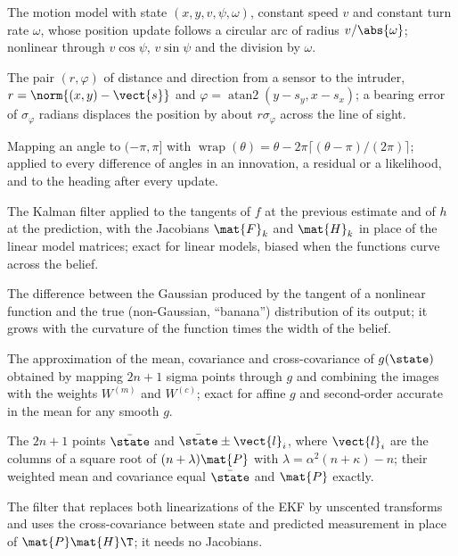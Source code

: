 \item[Coordinated-turn model] The motion model with state $(x, y, v, \psi, \omega)$, constant speed $v$ and constant turn rate $\omega$, whose position update follows a circular arc of radius $v/\abs{\omega}$; nonlinear through $v\cos\psi$, $v\sin\psi$ and the division by $\omega$.
\item[Range--bearing measurement] The pair $(r, \varphi)$ of distance and direction from a sensor to the intruder, $r = \norm{(x, y) - \vect{s}}$ and $\varphi = \operatorname{atan2}(y - s_y, x - s_x)$; a bearing error of $\sigma_\varphi$ radians displaces the position by about $r\sigma_\varphi$ across the line of sight.
\item[Angle wrapping] Mapping an angle to $(-\pi, \pi]$ with $\operatorname{wrap}(\theta) = \theta - 2\pi\lceil(\theta - \pi)/(2\pi)\rceil$; applied to every difference of angles in an innovation, a residual or a likelihood, and to the heading after every update.
\item[Extended Kalman filter (EKF)] The Kalman filter applied to the tangents of $f$ at the previous estimate and of $h$ at the prediction, with the Jacobians $\mat{F}_k$ and $\mat{H}_k$ in place of the linear model matrices; exact for linear models, biased when the functions curve across the belief.
\item[Linearization error] The difference between the Gaussian produced by the tangent of a nonlinear function and the true (non-Gaussian, ``banana'') distribution of its output; it grows with the curvature of the function times the width of the belief.
\item[Unscented transform] The approximation of the mean, covariance and cross-covariance of $g(\state)$ obtained by mapping $2n+1$ sigma points through $g$ and combining the images with the weights $W^{(m)}$ and $W^{(c)}$; exact for affine $g$ and second-order accurate in the mean for any smooth $g$.
\item[Sigma points] The $2n+1$ points $\bar{\state}$ and $\bar{\state} \pm \vect{l}_i$, where $\vect{l}_i$ are the columns of a square root of $(n+\lambda)\mat{P}$ with $\lambda = \alpha^2(n+\kappa) - n$; their weighted mean and covariance equal $\bar{\state}$ and $\mat{P}$ exactly.
\item[Unscented Kalman filter (UKF)] The filter that replaces both linearizations of the EKF by unscented transforms and uses the cross-covariance between state and predicted measurement in place of $\mat{P}\mat{H}\T$; it needs no Jacobians.
